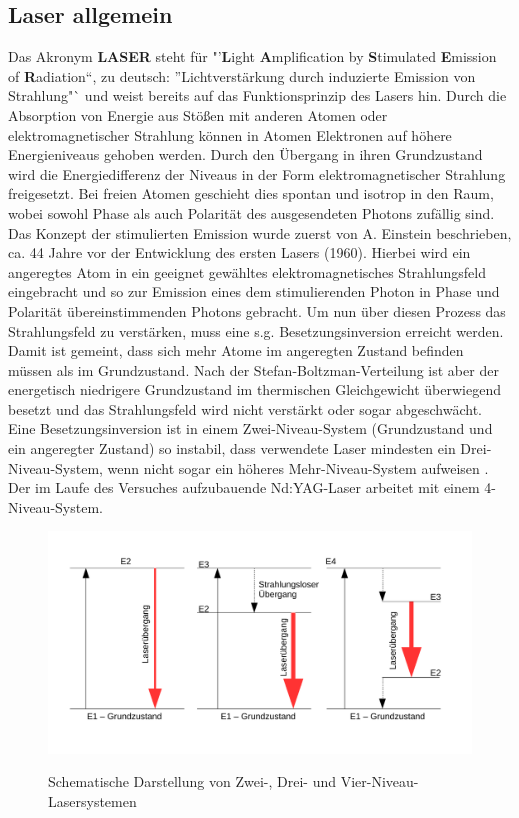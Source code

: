 \documentclass[twoside,colorback,accentcolor=tud4c,11pt]{tudreport}
\begin{document}
\subsection{Laser allgemein}
Das Akronym  \textbf{LASER} steht für "'\textbf{L}ight \textbf{A}mplification by \textbf{S}timulated \textbf{E}mission of \textbf{R}adiation"`, zu deutsch: "'Lichtverstärkung durch induzierte Emission von Strahlung"` und weist bereits auf das Funktionsprinzip des Lasers hin. Durch die Absorption von Energie aus Stößen mit anderen Atomen oder elektromagnetischer Strahlung können in Atomen Elektronen auf höhere Energieniveaus gehoben werden. Durch den Übergang in ihren Grundzustand wird die Energiedifferenz der Niveaus in der Form elektromagnetischer Strahlung freigesetzt. Bei freien Atomen geschieht dies spontan und isotrop in den Raum, wobei sowohl Phase als auch Polarität des ausgesendeten Photons zufällig sind.\\
Das Konzept der stimulierten Emission wurde zuerst von A. Einstein beschrieben, ca. 44 Jahre vor der Entwicklung des ersten Lasers (1960). Hierbei wird ein angeregtes Atom in ein geeignet gewähltes elektromagnetisches Strahlungsfeld eingebracht und so zur Emission eines dem stimulierenden Photon in Phase und Polarität übereinstimmenden Photons gebracht. Um nun über diesen Prozess das Strahlungsfeld zu verstärken, muss eine s.g. Besetzungsinversion erreicht werden. Damit ist gemeint, dass sich mehr Atome im angeregten Zustand befinden müssen als im Grundzustand. Nach der Stefan-Boltzman-Verteilung ist aber der energetisch niedrigere Grundzustand im thermischen Gleichgewicht überwiegend besetzt und das Strahlungsfeld wird nicht verstärkt oder sogar abgeschwächt. Eine Besetzungsinversion ist in einem Zwei-Niveau-System (Grundzustand und ein angeregter Zustand) so instabil, dass verwendete Laser mindesten ein Drei-Niveau-System, wenn nicht sogar ein höheres Mehr-Niveau-System aufweisen \cite{1}.\\
Der im Laufe des Versuches aufzubauende Nd:YAG-Laser arbeitet mit einem 4-Niveau-System.
\begin{figure}[H]
\centering
   	\begin{minipage}[b]{0.8\textwidth}
   	\includegraphics[width=\textwidth]{graphics/Lasersys.pdf}
  	\label{lasys}
   	\end{minipage}
\caption{Schematische Darstellung von Zwei-, Drei- und Vier-Niveau-Lasersystemen} 	
\end{figure}
\end{document}
